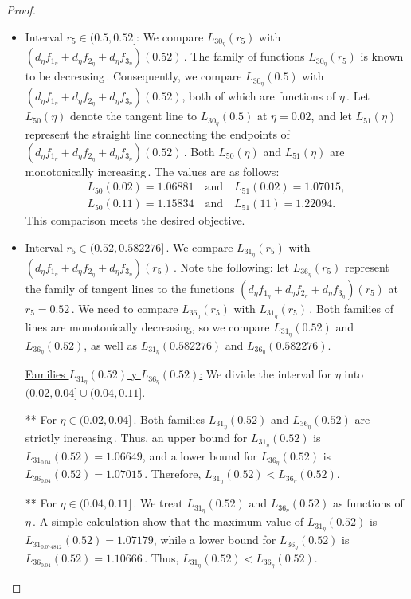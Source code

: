 \documentclass[final,11pt]{article}
\numberwithin{equation}{section}
\theoremstyle{definition}
\begin{document}
\begin{proof}
\begin{itemize}
\begin{itemize}
\begin{itemize}
\item Interval $r_{5}\in(0.5,0.52]$: We compare $L_{30_{\eta}}(r_{5})$ with $\left(d_{\eta}f_{1_{\eta}}+d_{ \eta}f_{2_{\eta}}+d_{\eta}f_{3_{\eta}}\right)(0.52)$\,. The family of functions $L_{30_{\eta}}(r_{5})$ is known to be decreasing\,. Consequently, we compare $L_{30_{\eta}}(0.5)$ with $\left(d_{\eta}f_{1_{\eta}}+d_{ \eta}f_{2_{\eta}}+d_{\eta}f_{3_{\eta}}\right)(0.52)$, both of which are functions of $\eta$\,. Let $L_{50}(\eta)$ denote the tangent line to $L_{30_{\eta}}(0.5)$ at $\eta=0.02$, and let $L_{51}(\eta)$ represent the straight line connecting the endpoints of $\left(d_{\eta}f_{1_{\eta}}+d_{ \eta}f_{2_{\eta}}+d_{\eta}f_{3_{\eta} }\right)(0.52)$\,. Both $L_{50}(\eta)$ and $L_{51}(\eta)$ are monotonically increasing\,. The values are as follows: 
\begin{equation*}
\begin{split}
L_{50}(0.02)=1.06881 \quad \mbox{and} \quad L_{51}(0.02)=1.07015,\\
L_{50}(0.11)=1.15834 \quad \mbox{and} \quad L_{51}(11)=1.22094.
\end{split}
\end{equation*}
This comparison meets the desired objective.

\item  Interval $r_{5}\in(0.52,0.582276]$\,. We compare $L_{31_{\eta}}(r_{5})$ with $\left(d_{\eta}f_{1_{\eta}}+d_{ \eta}f_{2_{\eta}}+d_{\eta}f_{3_{\eta}}\right)(r_{5})$\,.  Note the following: let $L_{36_{\eta}}(r_{5})$ represent the family of tangent lines to the functions $\left(d_{\eta}f_{1_{\eta}}+d_{\eta}f_{2_{\eta}}+d_{\eta}f_{3_{\eta}}\right)(r_{5})$ at $r_{5}=0.52$\,. We need to compare $L_{36_{\eta}}(r_{5})$ with $L_{31_{\eta}}(r_{5})$\,. Both families of lines are monotonically decreasing, so we compare $L_{31_{\eta}}(0.52)$ and $L_{36_{\eta}}(0.52)$, as well as $L_{31_{\eta}}(0.582276)$ and $L_{36_{\eta}}(0.582276)$.

\underline{Families $L_{31_{\eta}}(0.52)$ y $L_{36_{\eta}}(0.52)$:} We divide the interval for $\eta$ into $(0.02,0.04]\cup(0.04,0.11]$.

    ** For $\eta\in(0.02,0.04]$\,. Both families $L_{31_{\eta}}(0.52)$ and $L_{36_{\eta}}(0.52)$ are strictly increasing\,. Thus, an upper bound for $L_{31_{\eta}}(0.52 )$ is $L_{31_{0.04}}(0.52)=1.06649$, and a lower bound for $L_{36_{\eta}}(0.52)$ is $L_{36_{0.04}}(0.52)=1.07015 $\,. Therefore, $L_{31_{\eta}}(0.52)<L_{36_{\eta}}(0.52)$.
        
    ** For $\eta\in(0.04,0.11]$\,. We treat $L_{31_{\eta}}(0.52)$ and $L_{36_{\eta}}(0.52)$ as functions of $\eta$\,. A simple calculation show that the maximum value of $L_{31_{\eta}}(0.52)$ is $L_{31_{0.074812}}(0.52)=1.07179$, while a lower bound for $L_{36_{\eta}}(0.52)$ is $L_{36_{0.04}}(0.52)=1.10666$\,. Thus, $L_{31_{\eta}}(0.52)<L_{36_{\eta}}(0.52)$.
    

\end{itemize}
\end{itemize}
\end{itemize}
\end{proof}
\end{document}
